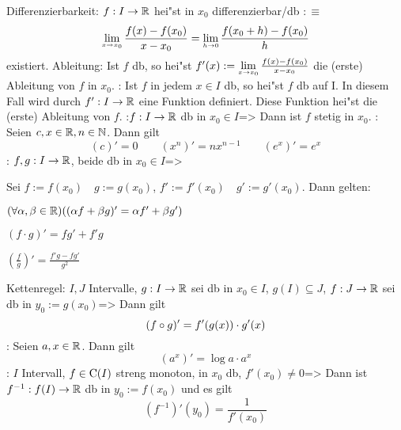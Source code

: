  Differenzierbarkeit:{
  $f:I\to\mathbb R$ hei"st in $x_0$ differenzierbar/db $:\equiv$
  \[\limx \xnull \frac{f(x)-f(x_0)}{x-x_0}=
    \limes h->0 \frac{f(x_0+h)-f(x_0)}h
    \]
  existiert.
  }
 Ableitung:{
  Ist $f$ db, so hei"st $f'(x):=\limx \xnull \frac{f(x)-f(x_0)}{x-x_0}$
  die (erste) Ableitung von $f$ in $x_0$.
  }
\remark:{
  Ist $f$ in jedem $x\in I$ db, so hei"st $f$ db auf I. In diesem
  Fall wird durch $f':I\to\mathbb R$ eine Funktion definiert.
  Diese Funktion hei"st die (erste) Ableitung von $f$.
  }
\theorem:$f:I\to\mathbb R$ db in $x_0\in I$=>{
  Dann ist $f$ stetig in $x_0$.
  }
\example:{
  Seien $c,x\in\mathbb R,n\in\mathbb N$. Dann gilt 
  \[(c)'=0 \qquad
    (x^n)'=nx^{n-1} \qquad
    (e^x)'=e^x
    \]
  }
\theorem:
  $f,g:I\to\mathbb R$, beide db in $x_0\in I$=>{
  Sei $f:=f(x_0) \quad g:=g(x_0)$, $f':=f'(x_0) \quad g':=g'(x_0)$.
  Dann gelten:
  \begin{stmts}
    \item $(\forall \alpha,\beta\in\mathbb R)((\alpha f+\beta g)'=\alpha f'+\beta g')$
    \item $(f\cdot g)'=fg'+f'g$
    \item $\left(\frac f g\right)'=\frac{f'g-fg'}{g^2}$
    \end{stmts}
  }
\theorem Kettenregel:
  $I,J$ Intervalle,
  $g: I\to\mathbb R$ sei db in $x_0\in I$,
  $g( I)\subseteq J$,
  $f: J\to\mathbb R$ sei db in $y_0:=g(x_0)$=>{
  Dann gilt
  \[(f\circ g)'=f'(g(x))\cdot g'(x)
    \]
  }
\example:{
  Seien $a,x\in\mathbb R$. Dann gilt 
  \[(a^x)'=\log a\cdot a^x
    \]
  }
\theorem:
  $I$ Intervall, $f\in{\rm C}(I)$ streng monoton, in $x_0$ db,
  $f'(x_0)\ne 0$=>{
  Dann ist $f^{-1}:f(I)\to\mathbb R$ db in $y_0:=f(x_0)$ und es gilt
  \[(f^{-1})'(y_0)=\frac 1{f'(x_0)}
    \]
  }
